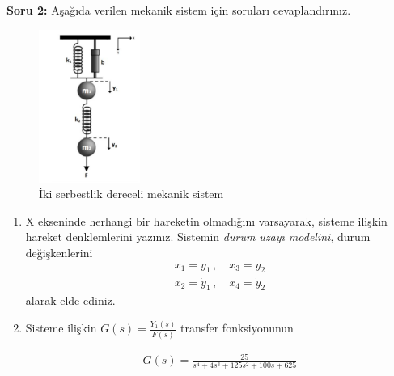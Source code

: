\documentclass[a4paper,11pt]{article}
\begin{document}
\newpage\textbf{Soru 2:} Aşağıda verilen mekanik sistem için soruları cevaplandırınız.
\begin{figure}[h]
    \centering
    \includegraphics[height=5cm]{fig2.png}
    \caption{İki serbestlik dereceli mekanik sistem}
    \label{fig:3}
\end{figure}
\begin{enumerate}[label=\textbf{\alph*}{.}]
\item X ekseninde herhangi bir hareketin olmadığını varsayarak, sisteme ilişkin hareket denklemlerini yazınız. Sistemin \emph{durum uzayı modelini}, durum değişkenlerini
\begin{gather*}
    x_1 = y_1 \,,\quad x_3 = y_2\\
    x_2 = \dot{y}_1 \,,\quad x_4 = \dot{y}_2
\end{gather*}
alarak elde ediniz.
\item Sisteme ilişkin $G(s) = \frac{Y_1(s)}{F(s)}$ transfer fonksiyonunun

\begin{gather*}
    G(s) = \frac{25}{s^4 + 4s^3 + 125s^2 + 100s + 625}
\end{gather*}


\end{enumerate}
\end{document}
